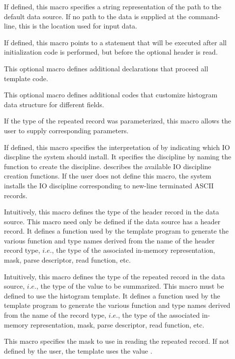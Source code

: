 \begin{description}

\item[] If defined, this macro specifies a string
  representation of the path to the default data source. If no path to
  the data is supplied at the command-line, this is the location used
  for input data. 

\item[] If defined, this macro points to a \C{}
  statement that will be executed after all initialization code is
  performed, but before the optional header is read.

\item[] This optional macro defines additional \C{}
  declarations that proceed all template code.

\item[] This optional macro defines additional \C{}
  codes that customize histogram data structure for different fields.

\item[] If the type of the repeated record was
  parameterized, this macro allows the user to supply corresponding
  parameters. 

\item[] If defined, this macro specifies the
  interpretation of \Precord{} by indicating which IO discpline the
  system should install. It specifies the discipline by naming the
  function to create the discipline. 
  describes the available IO discipline creation functions.  If the
  user does not define this macro, the system installs the IO
  discipline corresponding to  new-line terminated ASCII records.

\item[] Intuitively, this macro defines the type of
  the header record in the data source. This macro need only be
  defined if the data source has a header record. It defines a function used by the template program to
  generate the various function and type names derived from the name
  of the header record type, $i.e.$, the type of the associated in-memory
  representation, mask, parse descriptor, read function, etc.

\item[] Intuitively, this macro defines the type of the repeated
  record in the data source, $i.e.$, the type of the value to be
  summarized. This macro must be defined to use the histogram
  template. It defines a function used by the template program to
  generate the various function and type names derived from the name
  of the record type, $i.e.$, the type of the associated in-memory
  representation, mask, parse descriptor, read function, etc.

\item[] This macro specifies the mask to use in reading
  the repeated record. If not defined by the user, the template uses
  the value .

\end{description}
